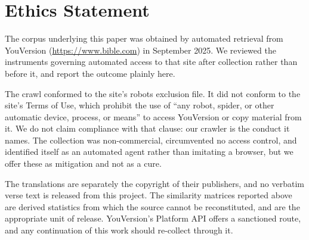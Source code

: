 \section*{Ethics Statement}
\label{sec:ethics_stmt}

The corpus underlying this paper was obtained by automated retrieval from
YouVersion (\url{https://www.bible.com}) in September 2025. We reviewed the
instruments governing automated access to that site after collection rather than
before it, and report the outcome plainly here.

The crawl conformed to the site's robots exclusion file. It did not conform to
the site's Terms of Use, which prohibit the use of ``any robot, spider, or other
automatic device, process, or means'' to access YouVersion or copy material from
it. We do not claim compliance with that clause: our crawler is the conduct it
names. The collection was non-commercial, circumvented no access control, and
identified itself as an automated agent rather than imitating a browser, but we
offer these as mitigation and not as a cure.

The translations are separately the copyright of their publishers, and no
verbatim verse text is released from this project. The similarity matrices
reported above are derived statistics from which the source cannot be
reconstituted, and are the appropriate unit of release. YouVersion's Platform API
offers a sanctioned route, and any continuation of this work should re-collect
through it.
